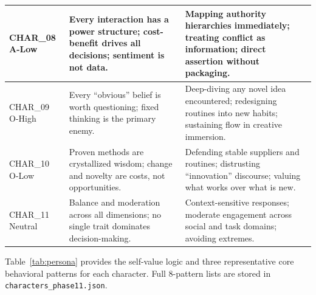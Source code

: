 \documentclass[11pt]{article}
\begin{document}
\begin{table}[!t]
{\begin{tabular}{p{1.5cm}p{4.2cm}p{8.5cm}}
\midrule
CHAR\_08 \newline A-Low &
Every interaction has a power structure; cost-benefit drives all decisions; sentiment is not data. &
Mapping authority hierarchies immediately; treating conflict as information; direct assertion without packaging. \\
\midrule
CHAR\_09 \newline O-High &
Every ``obvious'' belief is worth questioning; fixed thinking is the primary enemy. &
Deep-diving any novel idea encountered; redesigning routines into new habits; sustaining flow in creative immersion. \\
\midrule
CHAR\_10 \newline O-Low &
Proven methods are crystallized wisdom; change and novelty are costs, not opportunities. &
Defending stable suppliers and routines; distrusting ``innovation'' discourse; valuing what works over what is new. \\
\midrule
CHAR\_11 \newline Neutral &
Balance and moderation across all dimensions; no single trait dominates decision-making. &
Context-sensitive responses; moderate engagement across social and task domains; avoiding extremes. \\
\bottomrule
\end{tabular}%
}
\end{table}

Table~\ref{tab:persona} provides the self-value logic and three representative core behavioral patterns for each character. Full 8-pattern lists are stored in \texttt{characters\_phase11.json}.
\end{document}
